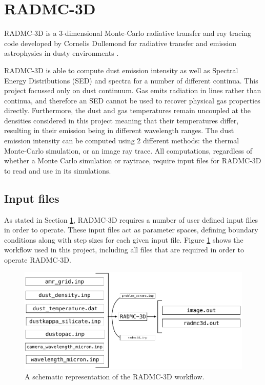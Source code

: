 \documentclass{report}
\begin{document}
\section{RADMC-3D} \label{radmc}
RADMC-3D is a 3-dimensional Monte-Carlo radiative transfer and ray tracing code developed by Cornelis Dullemond for radiative transfer and emission astrophysics in dusty environments \parencite{RADMC-3D}.

RADMC-3D is able to compute dust emission intensity as well as Spectral Energy Distributions (SED) and spectra for a number of different continua. This project focussed only on dust continuum. Gas emits radiation in lines rather than continua, and therefore an SED cannot be used to recover physical gas properties directly. Furthermore, the dust and gas temperatures remain uncoupled at the densities considered in this project meaning that their temperatures differ, resulting in their emission being in different wavelength ranges. The dust emission intensity can be computed using 2 different methods: the thermal Monte-Carlo simulation, or an image ray trace. All computations, regardless of whether a Monte Carlo simulation or raytrace, require input files for RADMC-3D to read and use in its simulations.

\subsection{Input files} \label{inp}
As stated in Section \ref{radmc}, RADMC-3D requires a number of user defined input files in order to operate. These input files act as parameter spaces, defining boundary conditions along with step sizes for each given input file. Figure \ref{fig:radmc3d-workflow} shows the workflow used in this project, including all files that are required in order to operate RADMC-3D.

\begin{figure}[h]
  \centering
  \includegraphics[scale=0.4]{../img/radmc3d-workflow}
  \caption[A schematic representation of the RADMC-3D workflow.]{A schematic representation of the RADMC-3D workflow.}
  \label{fig:radmc3d-workflow}
\end{figure}
\end{document}

